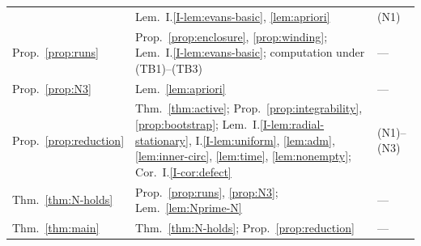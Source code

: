 \begin{longtable}{p{}p{}p{}}
  & \raggedright Lem.~I.\ref{I-lem:evans-basic}, \ref{lem:apriori} & (N1) \\
\raggedright Prop.~\ref{prop:runs}
  & \raggedright Prop.~\ref{prop:enclosure}, \ref{prop:winding}; Lem.~I.\ref{I-lem:evans-basic}; computation under (TB1)--(TB3) & --- \\
\raggedright Prop.~\ref{prop:N3}
  & \raggedright Lem.~\ref{lem:apriori} & --- \\
\raggedright Prop.~\ref{prop:reduction}
  & \raggedright Thm.~\ref{thm:active}; Prop.~\ref{prop:integrability}, \ref{prop:bootstrap}; Lem.~I.\ref{I-lem:radial-stationary}, I.\ref{I-lem:uniform}, \ref{lem:adm}, \ref{lem:inner-circ}, \ref{lem:time}, \ref{lem:nonempty}; Cor.~I.\ref{I-cor:defect} & (N1)--(N3) \\
\raggedright Thm.~\ref{thm:N-holds}
  & \raggedright Prop.~\ref{prop:runs}, \ref{prop:N3}; Lem.~\ref{lem:Nprime-N} & --- \\
\raggedright Thm.~\ref{thm:main}
  & \raggedright Thm.~\ref{thm:N-holds}; Prop.~\ref{prop:reduction} & --- \\
\end{longtable}
\endgroup

